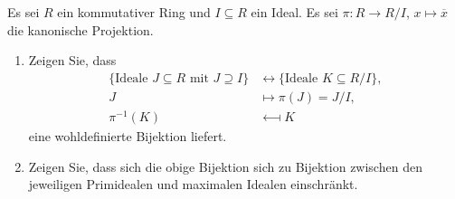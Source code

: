 \begin{question}
  \label{question: lattice isomorphism for quotients}
  Es sei $R$ ein kommutativer Ring und $I \subseteq R$ ein Ideal.
  Es sei $\pi \colon R \to R/I$, $x \mapsto \overline{x}$ die kanonische Projektion.
  \begin{enumerate}
    \item
      Zeigen Sie, dass
      \begin{align*}
                              \{ \text{Ideale $J \subseteq R$ mit $J \supseteq I$} \}
        &\longleftrightarrow  \{ \text{Ideale $K \subseteq R/I$} \},
        \\
                      J
        &\longmapsto  \pi(J) = J/I,
        \\
                        \pi^{-1}(K)
        &\longmapsfrom  K
      \end{align*}
      eine wohldefinierte Bijektion liefert.
    \item
      Zeigen Sie, dass sich die obige Bijektion sich zu Bijektion zwischen den jeweiligen Primidealen und maximalen Idealen einschränkt.
  \end{enumerate}
\end{question}


